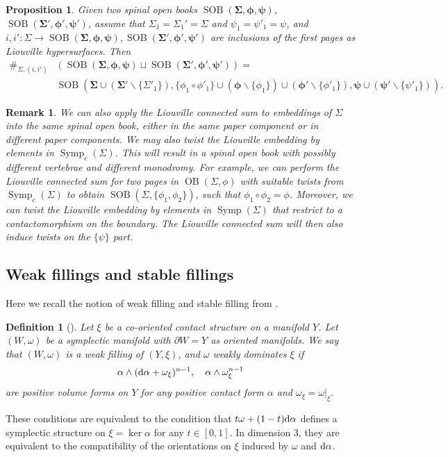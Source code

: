 \documentclass[11pt]{amsart}
\numberwithin{equation}{section}
\newtheorem{definition}[theorem]{\textbf{Definition}}
\newtheorem{proposition}[theorem]{\textbf{Proposition}}
\newtheorem{remark}[theorem]{\textbf{Remark}}
\def\rd{{\rm d}}
\DeclareMathOperator{\symp}{Symp}
\DeclareMathOperator{\OB}{OB}
\DeclareMathOperator{\SOB}{SOB}
\begin{document}
\begin{proposition}\label{prop:SOB_sum}
Given two spinal open books $\SOB\left(\bm{\Sigma}, \bm{\phi},\bm{\psi}\right)$, $\SOB\left(\bm{\Sigma'}, \bm{\phi'},\bm{\psi'}\right)$, assume that $\Sigma_1=\Sigma_1'=\Sigma$ and $\psi_1=\psi'_1=\psi$, and $i,i':\Sigma \to \SOB\left(\bm{\Sigma}, \bm{\phi},\bm{\psi}\right), \SOB\left(\bm{\Sigma'}, \bm{\phi'},\bm{\psi'}\right)$ are inclusions of the first pages as Liouville hypersurfaces. Then
\begin{align*}
 \#_{\Sigma,(i,i')} & \left(\SOB\left(\bm{\Sigma}, \bm{\phi},\bm{\psi}\right) \sqcup \SOB\left(\bm{\Sigma'}, \bm{\phi'},\bm{\psi'}\right)\right)=\\ 
 &\SOB\left(\bm{\Sigma}\cup \left(\bm{\Sigma'}\backslash\{\Sigma'_1\}\right), \{\phi_1\circ \phi'_1\}\cup \left(\bm{\phi}\backslash\{\phi_1\}\right)\cup  \left(\bm{\phi'}\backslash\{\phi'_1\}\right),\bm{\psi}\cup \left(\bm{\psi'}\backslash\{\psi'_1\}\right)\right).   
\end{align*}
\end{proposition}
\begin{remark}
    We can also apply the Liouville connected sum to embeddings of $\Sigma$ into the same spinal open book, either in the same paper component or in different paper components. We may also twist the Liouville embedding by elements in $\symp_c(\Sigma)$. This will result in a spinal open book with possibly different vertebrae and different monodromy. For example, we can perform the Liouville connected sum for two pages in $\OB(\Sigma,\phi)$ with suitable twists from $\symp_c(\Sigma)$ to obtain $\SOB(\Sigma, \{\phi_1,\phi_2\})$, such that $\phi_1\circ \phi_2=\phi$. Moreover, we can twist the Liouville embedding by elements in $\symp(\Sigma)$ that restrict to a contactomorphism on the boundary. The Liouville connected sum will then also induce twists on the $\{\psi\}$ part.
\end{remark}



\subsection{Weak fillings and stable fillings}
Here we recall the notion of weak filling and stable filling from \cite{MNW,LW}.
\begin{definition}[{\cite[Definition 4]{MNW}}]
Let $\xi$ be a co-oriented contact structure on a manifold $Y$. Let $(W, \omega)$ be a symplectic manifold with $\partial W = Y$ as oriented manifolds. We say that $(W, \omega)$ is a weak filling of $(Y, \xi)$, and $\omega$ weakly dominates $\xi$ if 
$$\alpha \wedge (\rd\alpha + \omega_{\xi})^{n-1},\quad \alpha \wedge \omega_\xi^{n-1}$$
are positive volume forms on $Y$ for any positive contact form $\alpha$ and $\omega_{\xi}=\omega|_{\xi}$. 
\end{definition}
These conditions are equivalent to the condition that $t\omega + (1-t)\rd \alpha$ defines a symplectic structure on $\xi=\ker \alpha$ for any $t\in [0,1]$. In dimension $3$, they are equivalent to the compatibility of the orientations on $\xi$ induced by $\omega$ and $\rd \alpha$.
\end{document}
